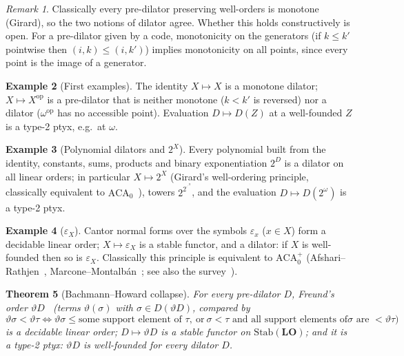 \documentclass[11pt]{article}
\newtheorem{theorem}{Theorem}[section]
\theoremstyle{definition}
\newtheorem{example}[theorem]{Example}
\theoremstyle{remark}
\newtheorem{remark}[theorem]{Remark}
\newcommand{\Stab}{\mathrm{Stab}}
\newcommand{\LO}{\mathbf{LO}}
\begin{document}
\begin{remark}
Classically every pre-dilator preserving well-orders is monotone (Girard),
so the two notions of dilator agree. Whether this holds constructively is
open. For a pre-dilator given by a code, monotonicity on the generators
(if $k\le k'$ pointwise then $(i,k)\le(i,k')$) implies monotonicity on all
points, since every point is the image of a generator.
\end{remark}

\begin{example}[First examples]
The identity $X\mapsto X$ is a monotone dilator; $X\mapsto X^{\mathrm{op}}$
is a pre-dilator that is neither monotone ($k<k'$ is reversed) nor a dilator
($\omega^{\mathrm{op}}$ has no accessible point). Evaluation
$D\mapsto D(Z)$ at a well-founded $Z$ is a type-2 ptyx, e.g.\ at $\omega$.
\end{example}

\begin{example}[Polynomial dilators and $2^X$]
Every polynomial built from the identity, constants, sums, products and
binary exponentiation $2^D$ is a dilator on all linear orders; in
particular $X\mapsto 2^X$ (Girard's well-ordering principle, classically
equivalent to $\mathrm{ACA}_0$~\cite{GirPTLC}), towers $2^{2^{\cdot^{\cdot^X}}}$, and the
evaluation $D\mapsto D(2^\omega)$ is a type-2 ptyx.
\end{example}

\begin{example}[$\varepsilon_X$]
Cantor normal forms over the symbols $\varepsilon_x$ ($x\in X$) form a
decidable linear order; $X\mapsto\varepsilon_X$ is a stable functor, and a
dilator: if $X$ is well-founded then so is $\varepsilon_X$. Classically
this principle is equivalent to $\mathrm{ACA}_0^+$ (Afshari--Rathjen~\cite{AR},
Marcone--Montalb\'an~\cite{MM}; see also the survey~\cite{Rat21}).
\end{example}

\begin{theorem}[Bachmann--Howard collapse]
For every pre-dilator $D$, Freund's order $\vartheta D$~\cite{Fre19} (terms
$\vartheta(\sigma)$ with $\sigma\in D(\vartheta D)$, compared by
\[\vartheta\sigma<\vartheta\tau\iff \vartheta\sigma\le\text{some support
element of }\tau,\ \text{or}\ \sigma<\tau\text{ and all support elements of
}\sigma\text{ are }<\vartheta\tau)\]
is a decidable linear order; $D\mapsto\vartheta D$ is a stable functor on
$\Stab(\LO)$; and it is a type-2 ptyx: $\vartheta D$ is well-founded for
every dilator $D$.
\end{theorem}
\end{document}
